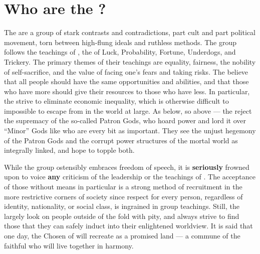 \documentclass[blue]{GL2020}
\begin{document}
\name{\bCultAvenger{}}

\section*{Who are the \pGoaties{}?}
The \pGoaties{} are a group of stark contrasts and contradictions, part cult and part political movement, torn between high-flung ideals and ruthless methods. The group follows the teachings of \cGenesis{}, the \cGenesis{\Deity} of Luck, Probability, Fortune, Underdogs, and Trickery. The primary themes of their teachings are equality, fairness, the nobility of self-sacrifice, and the value of facing one's fears and taking risks. The \pGoaties{} believe that all people should have the same opportunities and abilities, and that those who have more should give their resources to those who have less. In particular, the \pGoaties{} strive to eliminate economic inequality, which is otherwise difficult to impossible to escape from in the world at large. As below, so above — the \pGoaties{} reject the supremacy of the so-called Patron Gods, who hoard power and lord it over “Minor” Gods like \cGenesis{} who are every bit as important. They see the unjust hegemony of the Patron Gods and the corrupt power structures of the mortal world as integrally linked, and hope to topple both.

While the group ostensibly embraces freedom of speech, it is \textbf{seriously} frowned upon to voice \textbf{any} criticism of the leadership or the teachings of \cGenesis{}. The acceptance of those without means in particular is a strong method of recruitment in the more restrictive corners of society since respect for every person, regardless of identity, nationality, or social class, is ingrained in group teachings. Still, the \pGoaties{} largely look on people outside of the fold with pity, and always strive to find those that they can safely induct into their enlightened worldview. It is said that one day, the Chosen of \cGenesis{} will recreate \pEarth{} as a promised land — a commune of the faithful who will live together in harmony.
\end{document}
